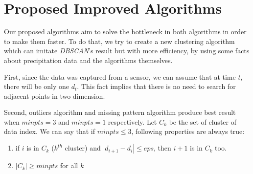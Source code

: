 \documentclass[conference]{IEEEtran}
\begin{document}
\section{Proposed Improved Algorithms}
Our proposed algorithms aim to solve the bottleneck in both algorithms in order to make them faster. To do that, we try to create a new clustering algorithm which can imitate \textit{DBSCAN}'s result but with more efficiency, by using some facts about precipitation data and the algorithms themselves.

%
%

First, since the data was captured from a sensor, we can assume that at time $t$, there will be only one $d_{t}$. This fact implies that there is no need to search for adjacent points in two dimension.

Second, outliers algorithm and missing pattern algorithm produce best result when $\textit{minpts} = 3$ and $\textit{minpts} = 1$ respectively. Let $C_{k}$ be the set of cluster of data index. We can say that if $\textit{minpts} \le 3$, following properties are always true:
\begin{enumerate}
	\item if $i$ is in $C_{k}$ (\textit{$k^{th}$} cluster) and $|d_{i+1} - d_{i}| \le \textit{eps}$, then $i+1$ is in $C_{k}$ too.
	\item $|C_{k}| \ge \textit{minpts}$ for all $k$ 
\end{enumerate}
\end{document}
